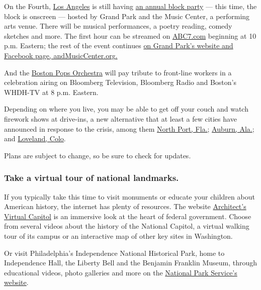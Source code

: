 On the Fourth,
\href{https://www.nytimes3xbfgragh.onion/2020/07/03/us/politics/july-4-events-los-angeles.html}{Los
Angeles} is still having \href{https://july4.grandparkla.org/}{an annual
block party} --- this time, the block is onscreen --- hosted by Grand
Park and the Music Center, a performing arts venue. There will be
musical performances, a poetry reading, comedy sketches and more. The
first hour can be streamed on \href{https://abc7.com/}{ABC7.com}
beginning at 10 p.m. Eastern; the rest of the event continues
\href{https://grandparkla.org/}{on Grand Park's website and Facebook
page,
and}\href{http://musiccenter.org/}{MusicCenter.org}\href{https://grandparkla.org/}{.}

And the
\href{https://www.bostonusa.com/event/a-boston-pops-salute-to-our-heroes/65476/}{Boston
Pops Orchestra} will pay tribute to front-line workers in a celebration
airing on Bloomberg Television, Bloomberg Radio and Boston's WHDH-TV at
8 p.m. Eastern.

Depending on where you live, you may be able to get off your couch and
watch firework shows at drive-ins, a new alternative that at least a few
cities have announced in response to the crisis, among them
\href{https://www.cityofnorthport.com/government/city-services/parks-recreation/special-events/freedom-festival}{North
Port, Fla.};
\href{https://news.auburnalabama.org/article/Top\%20Stories/3569}{Auburn,
Ala.}; and
\href{https://www.visitlovelandco.org/event/july-4th-drive-in-fireworks-show/}{Loveland,
Colo}.

Plans are subject to change, so be sure to check for updates.

\hypertarget{take-a-virtual-tour-of-national-landmarks}{%
\subsubsection{Take a virtual tour of national
landmarks.}\label{take-a-virtual-tour-of-national-landmarks}}

If you typically take this time to visit monuments or educate your
children about American history, the internet has plenty of resources.
The website
\href{https://www.capitol.gov/\#THMESEC_2010061447464\%7CTHME_2010062211742}{Architect's
Virtual Capitol} is an immersive look at the heart of federal
government. Choose from several videos about the history of the National
Capitol, a virtual walking tour of its campus or an interactive map of
other key sites in Washington.

Or visit Philadelphia's Independence National Historical Park, home to
Independence Hall, the Liberty Bell and the Benjamin Franklin Museum,
through educational videos, photo galleries and more on the
\href{https://www.nps.gov/inde/learn/photosmultimedia/index.htm}{National
Park Service's website}.

